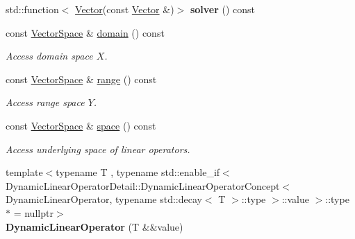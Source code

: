 \begin{DoxyCompactItemize}
\item 
std\+::function$<$ \hyperlink{classSpacy_1_1Vector}{Vector}(const \hyperlink{classSpacy_1_1Vector}{Vector} \&)$>$ {\bfseries solver} () const \hypertarget{classSpacy_1_1DynamicLinearOperator_acdd0c580689445355892fa2e78694f76}{}\label{classSpacy_1_1DynamicLinearOperator_acdd0c580689445355892fa2e78694f76}

\item 
const \hyperlink{classSpacy_1_1VectorSpace}{Vector\+Space} \& \hyperlink{classSpacy_1_1DynamicLinearOperator_aa5882565e1a88f20a16f7e7a27df3015}{domain} () const \hypertarget{classSpacy_1_1DynamicLinearOperator_aa5882565e1a88f20a16f7e7a27df3015}{}\label{classSpacy_1_1DynamicLinearOperator_aa5882565e1a88f20a16f7e7a27df3015}

\begin{DoxyCompactList}\small\item\em Access domain space $X$. \end{DoxyCompactList}\item 
const \hyperlink{classSpacy_1_1VectorSpace}{Vector\+Space} \& \hyperlink{classSpacy_1_1DynamicLinearOperator_a08e5f8bd41f1112ae349e50dd773b9ea}{range} () const \hypertarget{classSpacy_1_1DynamicLinearOperator_a08e5f8bd41f1112ae349e50dd773b9ea}{}\label{classSpacy_1_1DynamicLinearOperator_a08e5f8bd41f1112ae349e50dd773b9ea}

\begin{DoxyCompactList}\small\item\em Access range space $Y$. \end{DoxyCompactList}\item 
const \hyperlink{classSpacy_1_1VectorSpace}{Vector\+Space} \& \hyperlink{classSpacy_1_1DynamicLinearOperator_afde64039ceab0ad8752bce3ac2187a41}{space} () const \hypertarget{classSpacy_1_1DynamicLinearOperator_afde64039ceab0ad8752bce3ac2187a41}{}\label{classSpacy_1_1DynamicLinearOperator_afde64039ceab0ad8752bce3ac2187a41}

\begin{DoxyCompactList}\small\item\em Access underlying space of linear operators. \end{DoxyCompactList}\item 
{\footnotesize template$<$typename T , typename std\+::enable\+\_\+if$<$ Dynamic\+Linear\+Operator\+Detail\+::\+Dynamic\+Linear\+Operator\+Concept$<$ Dynamic\+Linear\+Operator, typename std\+::decay$<$ T $>$\+::type $>$\+::value $>$\+::type $\ast$  = nullptr$>$ }\\{\bfseries Dynamic\+Linear\+Operator} (T \&\&value)\hypertarget{classSpacy_1_1DynamicLinearOperator_a3fb5b02bd4c03894dc502a936a9a3ec8}{}\label{classSpacy_1_1DynamicLinearOperator_a3fb5b02bd4c03894dc502a936a9a3ec8}


\end{DoxyCompactItemize}
